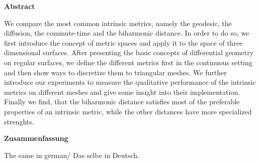 

\clearemptydoublepage
{}
{}





\vspace*{2cm}
\begin{center}
{\Large \bfseries Abstract}
\end{center}
\vspace{1cm}

We compare the most common intrinsic metrics, namely the geodesic, the diffusion, the commute-time and the biharmonic distance.
In order to do so, we first introduce the concept of metric spaces and apply it to the space of three dimensional surfaces.
After presenting the basic concepts of differential geometry on regular surfaces, we define the different metrics first in the continuous setting and then show ways to discretize them to triangular meshes.
We further introduce our experiments to measure the qualitative performance of the intrinsic metrics on different meshes and give some insight into their implementation.
Finally we find, that the biharmonic distance satisfies most of the preferable properties of an intrinsic metric, while the other distances have more specialized strenghts.

\vspace*{2cm}
\begin{center}
{\Large \bfseries Zusammenfassung}
\end{center}
\vspace{1cm}

The same in german/ Das selbe in Deutsch.
